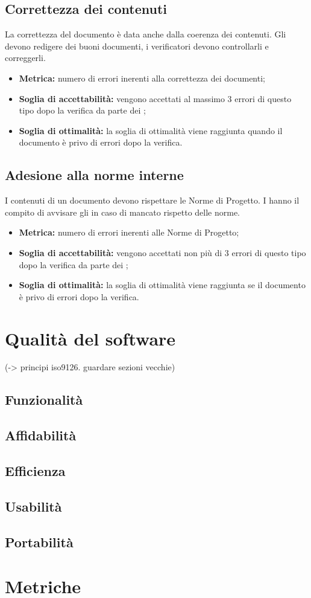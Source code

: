\subsection{Correttezza dei contenuti}
La correttezza del documento è data anche dalla coerenza dei contenuti. Gli  devono redigere dei buoni documenti, i verificatori devono controllarli e correggerli.
\begin{itemize}
    \item \textbf{Metrica:} numero di errori inerenti alla correttezza dei documenti;
    \item \textbf{Soglia di accettabilità:} vengono accettati al massimo 3 errori di questo tipo dopo la verifica da parte dei ;
    \item \textbf{Soglia di ottimalità:} la soglia di ottimalità viene raggiunta quando il documento è privo di errori dopo la verifica.
\end{itemize}
\subsection{Adesione alla norme interne}
I contenuti di un documento devono rispettare le Norme di Progetto. I  hanno il compito di avvisare gli  in caso di mancato rispetto delle norme.
\begin{itemize}
    \item \textbf{Metrica:} numero di errori inerenti alle Norme di Progetto;
    \item \textbf{Soglia di accettabilità:} vengono accettati non più di 3 errori di questo tipo dopo la verifica da parte dei ;
    \item \textbf{Soglia di ottimalità:} la soglia di ottimalità viene raggiunta se il documento è privo di errori dopo la verifica.
\end{itemize}

\section{Qualità del software}
\label{software}
(-> principi iso9126. guardare sezioni vecchie) 

\subsection{Funzionalità}

\subsection{Affidabilità}

\subsection{Efficienza}

\subsection{Usabilità}

\subsection{Portabilità}

\section{Metriche}